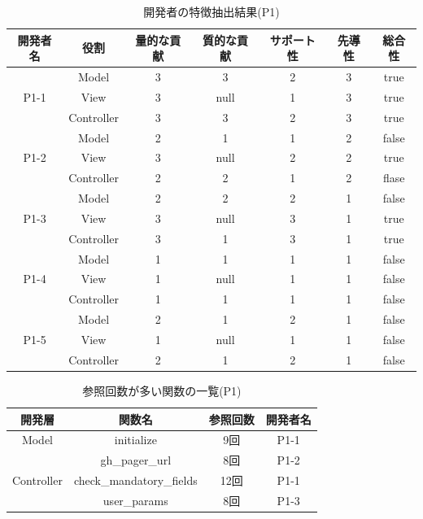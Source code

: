 \documentclass{funthesis}
\begin{document}
\begin{table}[H]
  \begin{center}
\begin{tabular}{|c|c|c|c|c|c|c|}
\hline
開発者名 & 役割 & 量的な貢献 & 質的な貢献 & サポート性 & 先導性 & 総合性\\ \hline
& Model & 3 & 3 & 2 & 3 & true\\ \cline{2-7}
P1-1 & View & 3 & null & 1 & 3 & true\\ \cline{2-7}
& Controller & 3 & 3 & 2 & 3 & true \\ \hline \hline

& Model & 2 & 1 & 1 & 2 & false\\ \cline{2-7}
P1-2 & View & 3 & null & 2 & 2 & true\\ \cline{2-7}
& Controller & 2 & 2 & 1 & 2 & flase \\ \hline \hline

& Model & 2 & 2 & 2 & 1 & false\\ \cline{2-7}
P1-3 & View & 3 & null & 3 & 1 & true\\ \cline{2-7}
& Controller & 3 & 1 & 3 & 1 & true \\ \hline \hline

& Model & 1 & 1 & 1 & 1 & false\\ \cline{2-7}
P1-4 & View & 1 & null & 1 & 1 & false\\ \cline{2-7}
& Controller & 1 & 1 & 1 & 1 & false \\ \hline \hline

& Model & 2 & 1 & 2 & 1 & false\\ \cline{2-7}
P1-5 & View & 1 & null & 1 & 1 & false\\ \cline{2-7}
& Controller & 2 & 1 & 2 & 1 & false \\ \hline
\end{tabular}
  \end{center}
  \caption{開発者の特徴抽出結果(P1)}    \label{sample}
\end{table}
\begin{table}[H]
  \begin{center}
\begin{tabular}{|c|c|c|c|}\hline
開発層&関数名&参照回数&開発者名\\ \hline
Model& initialize & 9回 & P1-1 \\ \cline{2-4}
& gh\_pager\_url & 8回 & P1-2 \\ \cline{2-4}\hline\hline
Controller& check\_mandatory\_fields & 12回 & P1-1 \\ \cline{2-4}
& user\_params & 8回 & P1-3 \\ \cline{2-4}\hline
\end{tabular}    
\caption{参照回数が多い関数の一覧(P1)}    \label{sample}
  \end{center}
\end{table}
\end{document}
